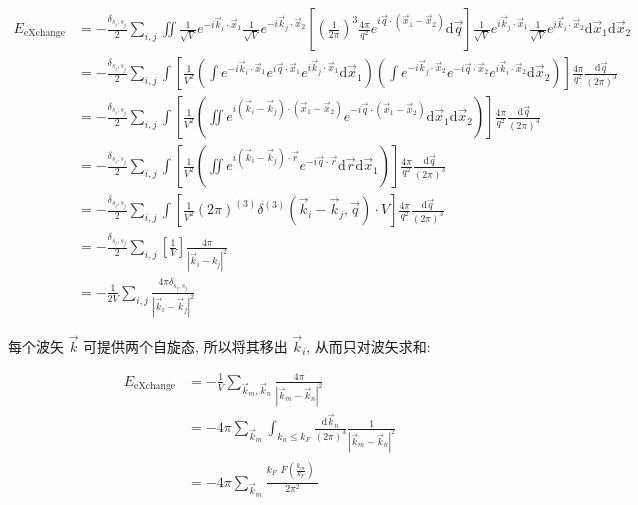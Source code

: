 \documentclass[../../main.tex]{subfiles}
\begin{document}
\begin{align*}
  E_{\text{eXchange}} 
  &= -\frac{\delta_{s_{i},s_{j}}}{2}\sum_{i,j}\iint
  \frac{1}{\sqrt{V}}e^{-i\vec{k}_{i}\cdot\vec{x}_{1}}
  \frac{1}{\sqrt{V}}e^{-i\vec{k}_{j}\cdot\vec{x}_{2}}
  \left[
    \left(\frac{1}{2\pi}\right)^{3}\frac{4\pi}{q^{2}}e^{i\vec{q}\cdot(\vec{x}_{1}-\vec{x}_{2})}\mathrm{d}\vec{q}
    \right]
  \frac{1}{\sqrt{V}}e^{ i\vec{k}_{j}\cdot\vec{x}_{1}}
  \frac{1}{\sqrt{V}}e^{ i\vec{k}_{i}\cdot\vec{x}_{2}}
  \mathrm{d}\vec{x}_{1}\mathrm{d}\vec{x}_{2}\\
  &= -\frac{\delta_{s_{i},s_{j}}}{2}\sum_{i,j}\int\left[
    \frac{1}{V^{2}}
    \left(\int
      e^{-i\vec{k}_{i}\cdot\vec{x}_{1}}
      e^{i\vec{q}\cdot\vec{x}_{1}}
      e^{i\vec{k}_{j}\cdot\vec{x}_{1}}
    \mathrm{d}\vec{x}_{1}\right)
    \left(\int
      e^{-i\vec{k}_{j}\cdot\vec{x}_{2}}
      e^{-i\vec{q}\cdot\vec{x}_{2}}
      e^{i\vec{k}_{i}\cdot\vec{x}_{2}}
    \mathrm{d}\vec{x}_{2}\right)
  \right]\frac{4\pi}{q^{2}}\frac{\mathrm{d}\vec{q}}{(2\pi)^{3}}\\
  &= -\frac{\delta_{s_{i},s_{j}}}{2}\sum_{i,j}\int\left[
    \frac{1}{V^{2}}
    \left(\iint
      e^{ i(\vec{k}_{i} - \vec{k}_{j})\cdot(\vec{x}_{1}-\vec{x}_{2})}
      e^{-i\vec{q}\cdot(\vec{x}_{1}-\vec{x}_{2})}
      \mathrm{d}\vec{x}_{1}\mathrm{d}\vec{x}_{2}
    \right)
  \right]\frac{4\pi}{q^{2}}\frac{\mathrm{d}\vec{q}}{(2\pi)^{3}}\\
  &= -\frac{\delta_{s_{i},s_{j}}}{2}\sum_{i,j}\int\left[
    \frac{1}{V^{2}}
    \left(\iint
      e^{ i(\vec{k}_{i} - \vec{k}_{j})\cdot\vec{r}}
      e^{-i\vec{q}\cdot\vec{r}}
     \mathrm{d}\vec{r}\mathrm{d}\vec{x}_{1}
    \right)
  \right]\frac{4\pi}{q^{2}}\frac{\mathrm{d}\vec{q}}{(2\pi)^{3}}\\
  &= -\frac{\delta_{s_{i},s_{j}}}{2}\sum_{i,j}\int\left[
  \frac{1}{V^{2}}
    (2\pi)^{(3)}\delta^{(3)}(\vec{k}_{i}-\vec{k}_{j},\vec{q})\cdot V
  \right]\frac{4\pi}{q^{2}}\frac{\mathrm{d}\vec{q}}{(2\pi)^{3}}\\
  &= -\frac{\delta_{s_{i},s_{j}}}{2}\sum_{i,j}\left[
    \frac{1}{V}
    \right]\frac{4\pi}{|\vec{k}_{i}-k_{j}|^{2}}\\
    &= -\frac{1}{2V}\sum_{i,j}\frac{4\pi\delta_{s_{i},s_{j}}}{|\vec{k}_{i}-\vec{k}_{j}|^{2}}
\end{align*}

每个波矢 $\vec{k}$ 可提供两个自旋态, 所以将其移出 $\vec{k}_{i}$, 从而只对波矢求和:

\begin{align*}
  E_{\text{eXchange}} &= -\frac{1}{V}\sum_{\vec{k}_{m},\vec{k}_{n}}\frac{4\pi}{|\vec{k}_{m}-\vec{k}_{n}|^{2}}\\
  &= -4\pi\sum_{\vec{k}_{m}}\int_{k_{n}\leq k_{F}}\frac{\mathrm{d}\vec{k}_{n}}{(2\pi)^{3}}\frac{1}{|\vec{k}_{m}-\vec{k}_{n}|^{2}}\\
  &= -4\pi\sum_{\vec{k}_{m}}\frac{k_{F}\begin{aligned}
    F\left(\frac{k_{m}}{k_{F}}\right)
  \end{aligned}}{2\pi^{2}}
\end{align*}
\end{document}
